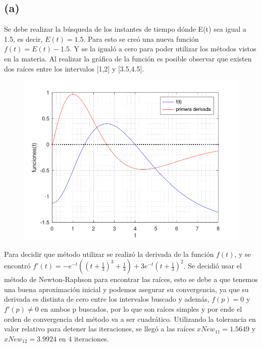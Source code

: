 \documentclass[11pt]{article}
\begin{document}
\subsection*{(a)}
Se debe realizar la búsqueda de los instantes de tiempo dónde E(t) sea igual a 1.5, es decir,
$E(t)=1.5$. Para esto se creó una nueva función $f(t)=E(t)-1.5$. Y se la igualó a cero para poder
utilizar los métodos vistos en la materia. Al realizar la gráfica de la función es posible observar
que existen dos raíces entre los intervalos [1,2] y [3.5,4.5].
\begin{figure}[!h]
  \centering
  \includegraphics[scale=0.5]{incisoA.png}
\end{figure}

Para decidir que método utilizar se realizó la derivada de la función $f(t)$, y se encontró
$f'(t)=-e^{-t}((t+\frac{1}{3})^3+\frac{1}{3})+3e^{-t}(t+\frac{1}{3})^2$.
Se decidió usar el método de Newton-Raphson para encontrar las raíces, esto se debe a
que tenemos una buena aproximación inicial y podemos asegurar su convergencia,
ya que su derivada es distinta de cero entre los intervalos buscado y además,  $f(p)=0$ y $f'(p)\ne 0$ en ambos p buscados,
por lo que son raíces simples y por ende el orden de convergencia del método va a ser cuadrático.
Utilizando la tolerancia en valor relativo para detener las iteraciones, se llegó
a las raíces $xNew_{11}=1.5649$ y $xNew_{12}=3.9924$ en 4 iteraciones.

\newpage
\end{document}
